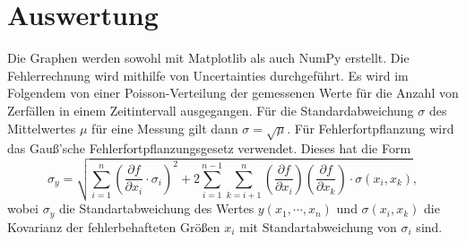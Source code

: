 \section{Auswertung}
\label{sec:Auswertung}


Die Graphen werden sowohl mit Matplotlib \cite{matplotlib} als auch NumPy \cite{numpy} erstellt. Die
Fehlerrechnung wird mithilfe von Uncertainties \cite{uncertainties} durchgeführt. Es wird im Folgendem
von einer Poisson-Verteilung der gemessenen Werte für die Anzahl von Zerfällen in einem Zeitintervall ausgegangen. Für die Standardabweichung $\sigma$ des Mittelwertes $\mu$ für eine Messung gilt dann $\sigma=\sqrt{\mu}$. Für Fehlerfortpflanzung wird das Gauß'sche Fehlerfortpflanzungsgesetz verwendet. Dieses hat die Form
\begin{equation}
	\sigma_y=\sqrt{\sum\limits_{i=1}^{n}\left(\frac{\partial f}{\partial x_i} \cdot \sigma_i\right)^2+2 \sum\limits_{i=1}^{n-1} \sum\limits_{k=i+1}^n\left(\frac{\partial f}{\partial x_i}\right) \left(\frac{\partial f}{\partial x_k}\right) \cdot \sigma(x_i,x_k)} \label{Gauss},
\end{equation}
wobei $\sigma_y$ die Standartabweichung des Wertes $y(x_1,\cdots, x_n)$ und $\sigma(x_i,x_k)$ die Kovarianz der fehlerbehafteten Größen $x_i$  mit Standartabweichung von $\sigma_i$ sind.



